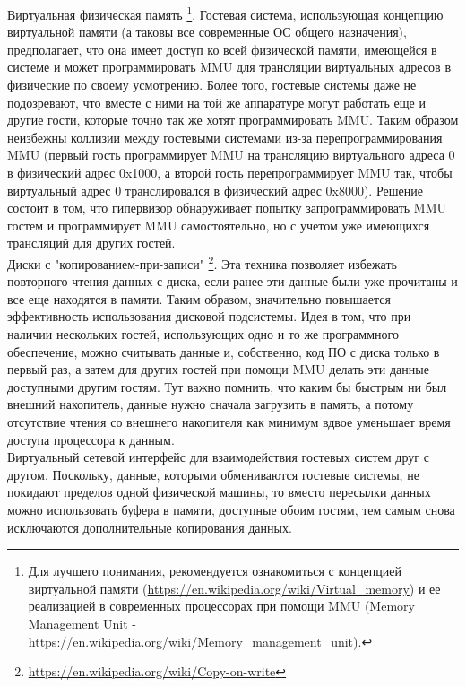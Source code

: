 \documentclass[14pt, a4paper]{article}
\begin{document}
Виртуальная физическая память \footnote{Для лучшего понимания, рекомендуется ознакомиться с концепцией виртуальной памяти
(\href{https://en.wikipedia.org/wiki/Virtual_memory}{https://en.wikipedia.org/wiki/Virtual\_memory}) и ее реализацией в современных процессорах при
помощи MMU (Memory Management Unit - \href{https://en.wikipedia.org/wiki/Memory_management_unit}{https://en.wikipedia.org/wiki/Memory\_management\_unit}).}. Гостевая система, использующая концепцию
виртуальной памяти (а таковы все современные ОС общего назначения),
предполагает, что она имеет доступ ко всей физической памяти, имеющейся в системе
и может программировать MMU для трансляции виртуальных адресов в физические по
своему усмотрению. Более того, гостевые системы даже не подозревают, что вместе с
ними на той же аппаратуре могут работать еще и другие гости, которые точно так же
хотят программировать MMU. Таким образом неизбежны коллизии между гостевыми
системами из-за перепрограммирования MMU (первый гость программирует MMU на
трансляцию виртуального адреса 0 в физический адрес 0x1000, а второй гость
перепрограммирует MMU так, чтобы виртуальный адрес 0 транслировался в
физический адрес 0x8000). Решение состоит в том, что гипервизор обнаруживает
попытку запрограммировать MMU гостем и программирует MMU самостоятельно, но с
учетом уже имеющихся трансляций для других гостей.\\

Диски с "копированием-при-записи" \footnote{\href{https://en.wikipedia.org/wiki/Copy-on-write}{https://en.wikipedia.org/wiki/Copy-on-write}}. Эта техника позволяет избежать повторного
чтения данных с диска, если ранее эти данные были уже прочитаны и все еще
находятся в памяти. Таким образом, значительно повышается эффективность
использования дисковой подсистемы. Идея в том, что при наличии нескольких гостей,
использующих одно и то же программного обеспечение, можно считывать данные и,
собственно, код ПО с диска только в первый раз, а затем для других гостей при
помощи MMU делать эти данные доступными другим гостям. Тут важно помнить, что
каким бы быстрым ни был внешний накопитель, данные нужно сначала загрузить в
память, а потому отсутствие чтения со внешнего накопителя как минимум вдвое
уменьшает время доступа процессора к данным.\\

Виртуальный сетевой интерфейс для взаимодействия гостевых систем друг с другом.
Поскольку, данные, которыми обмениваются гостевые системы, не покидают пределов
одной физической машины, то вместо пересылки данных можно использовать буфера
в памяти, доступные обоим гостям, тем самым снова исключаются дополнительные
копирования данных.\\
\end{document}
